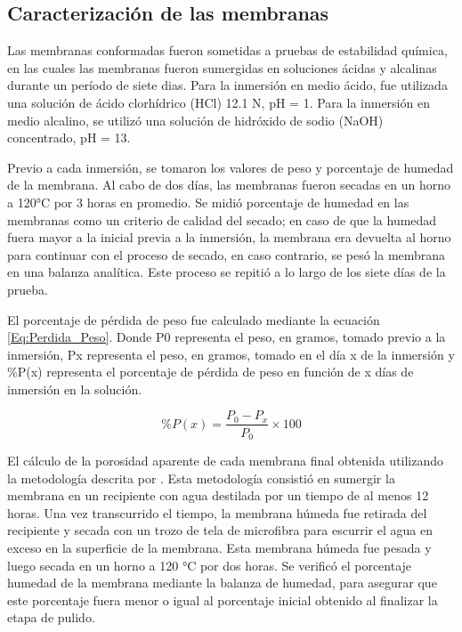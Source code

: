 \documentclass{article}
\begin{document}
\subsection{Caracterización de las membranas}

Las membranas conformadas fueron sometidas a pruebas de estabilidad química, en las cuales las membranas fueron sumergidas en soluciones ácidas y alcalinas durante un período de siete dias. Para la inmersión en medio ácido, fue utilizada una solución de ácido clorhídrico (HCl) 12.1 N, pH = 1. Para la inmersión en medio alcalino, se utilizó una solución de hidróxido de sodio (NaOH) concentrado, pH = 13. 

Previo a cada inmersión, se tomaron los valores de peso y porcentaje de humedad de la membrana. Al cabo de dos días, las membranas fueron secadas en un horno a 120°C por 3 horas en promedio. Se midió porcentaje de humedad en las membranas como un criterio de calidad del secado; en caso de que la humedad fuera mayor a la inicial previa a la inmersión, la membrana era devuelta al horno para continuar con el proceso de secado, en caso contrario, se pesó la membrana en una balanza analítica. Este proceso se repitió a lo largo de los siete días de la prueba. 

El porcentaje de pérdida de peso fue calculado mediante la ecuación \ref{Eq:Perdida_Peso}. Donde P0 representa el peso, en gramos, tomado previo a la inmersión, Px representa el peso, en gramos, tomado en el día x de la inmersión y \%P(x) representa el porcentaje de pérdida de peso en función de x días de inmersión en la solución.   

\begin{equation}
    \%P(x) = \frac{P_0-P_x}{P_0} \times 100
    \label{Eq:Perdida_Peso}
\end{equation}

El cálculo de la porosidad aparente de cada membrana final obtenida utilizando la metodología descrita por \parencite[p~122]{Purkait2018}. Esta metodología consistió en sumergir la membrana en un recipiente con agua destilada por un tiempo de al menos 12 horas. Una vez transcurrido el tiempo, la membrana húmeda fue retirada del recipiente y secada con un trozo de tela de microfibra para escurrir el agua en exceso en la superficie de la membrana. Esta membrana húmeda fue pesada y luego secada en un horno a 120 °C por dos horas. Se verificó el porcentaje humedad de la membrana mediante la balanza de humedad, para asegurar que este porcentaje fuera menor o igual al porcentaje inicial obtenido al finalizar la etapa de pulido. 
\end{document}
